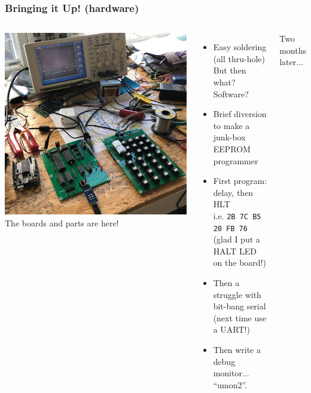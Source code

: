 \documentclass{beamer}
\newcommand{\tred}[1]{\textcolor{my-red}{#1}}
\newcommand{\tgreen}[1]{\textcolor{my-green}{#1}}
\begin{document}
\begin{frame}
  \frametitle{Bringing it Up! (hardware)}
  \begin{columns}
    \includegraphics[width=\textwidth]{figs/bench.jpg}
    \tgreen{The boards and parts are here!}
    \begin{itemize}
    \scriptsize
    \item Easy soldering (all thru-hole) \\
      But then what?  Software?
    \item Brief diversion to make a junk-box EEPROM programmer
    \item First program:  delay, then HLT \\
       i.e. {\tt 2B 7C B5 20 FB 76} \\
       (glad I put a HALT LED on the board!)
    \item Then a struggle with bit-bang serial \\
       (next time use a UART!)
    \item Then write a debug monitor... ``umon2''.
    \end{itemize}
    \tred{Two months later...}
\end{columns}
\end{frame}
\end{document}
